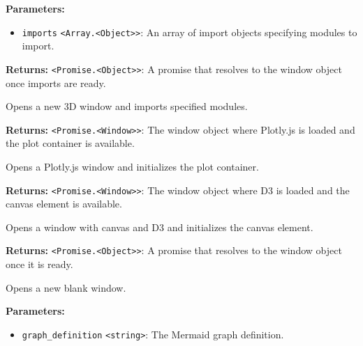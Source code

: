 \documentclass[12pt,a4paper]{article}
\begin{document}
\noindent \textbf{Parameters:}
\begin{itemize}
  \item \texttt{imports} \texttt{<Array.<Object>>}: An array of import objects specifying modules to import.
\end{itemize}

\noindent \textbf{Returns:} \texttt{<Promise.<Object>>}: A promise that resolves to the window object once imports are ready.

\noindent Opens a new 3D window and imports specified modules.

\vspace{5mm}
\noindent {}


\noindent \textbf{Returns:} \texttt{<Promise.<Window>>}: The window object where Plotly.js is loaded and the plot container is available.

\noindent Opens a Plotly.js window and initializes the plot container.

\vspace{5mm}
\noindent {}


\noindent \textbf{Returns:} \texttt{<Promise.<Window>>}: The window object where D3 is loaded and the canvas element is available.

\noindent Opens a window with canvas and D3 and initializes the canvas element.

\vspace{5mm}
\noindent {}


\noindent \textbf{Returns:} \texttt{<Promise.<Object>>}: A promise that resolves to the window object once it is ready.

\noindent Opens a new blank window.

\vspace{5mm}
\noindent {}


\noindent \textbf{Parameters:}
\begin{itemize}
  \item \texttt{graph\_definition} \texttt{<string>}: The Mermaid graph definition.
\end{itemize}
\end{document}
